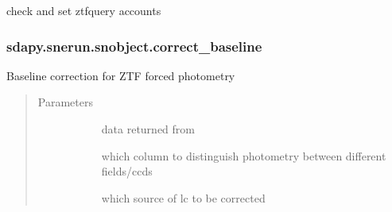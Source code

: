\documentclass[letterpaper,10pt,english]{sphinxmanual}
\begin{document}
\begin{fulllineitems}
\begin{fulllineitems}
\label{\detokenize{generated/sdapy.snerun.snobject.config_ztfquery:sdapy.snerun.snobject.config_ztfquery}}
check and set ztfquery accounts

\end{fulllineitems}



\subsubsection{sdapy.snerun.snobject.correct\_baseline}
\label{\detokenize{generated/sdapy.snerun.snobject.correct_baseline:sdapy-snerun-snobject-correct-baseline}}\label{\detokenize{generated/sdapy.snerun.snobject.correct_baseline::doc}}

\begin{fulllineitems}
\label{\detokenize{generated/sdapy.snerun.snobject.correct_baseline:sdapy.snerun.snobject.correct_baseline}}
Baseline correction for ZTF forced photometry
\begin{quote}\begin{description}
\item[{Parameters}] \leavevmode\begin{description}
\item[{}] \leavevmode{[}\sphinxtitleref{dictionary}{]}
data returned from 

\item[{}] \leavevmode{[}\sphinxtitleref{str}{]}
which column to distinguish photometry between different fields/ccds

\item[{}] \leavevmode{[}\sphinxtitleref{str}{]}
which source of lc to be corrected

\end{description}

\end{description}\end{quote}


\end{fulllineitems}
\end{fulllineitems}
\end{document}
